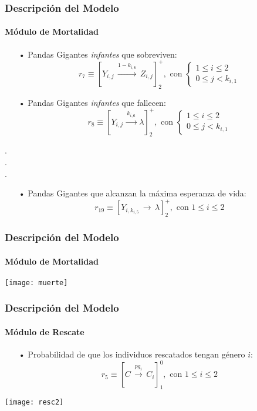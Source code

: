 \documentclass[10pt,a4paper]{beamer}
\theoremstyle{definition}
\theoremstyle{remark}
\begin{document}
\begin{frame}
\frametitle{Descripción del Modelo}
\framesubtitle{Módulo de Mortalidad}
\begin{small}
\begin{itemize}
\item[•] Pandas Gigantes \textit{infantes} que sobreviven:
$$r_7 \equiv [Y_{i,j} \,\xrightarrow{1-k_{i,6}} \, Z_{i,j} ]^+_2 , \text{ con } \left \{ \begin{matrix} 1 \leq i \leq 2
\\ 0 \leq j < k_{i,1} \end{matrix}\right. $$
\item[•] Pandas Gigantes \textit{infantes} que fallecen:
$$r_8 \equiv [Y_{i,j} \,\xrightarrow{k_{i,6}} \, \lambda ]^+_2 , \text{ con } \left \{ \begin{matrix} 1 \leq i \leq 2
\\ 0 \leq j < k_{i,1} \end{matrix}\right. $$
\end{itemize}
\begin{center}
.\\
.\\
.
\end{center}
\begin{itemize}
\item[•] Pandas Gigantes que alcanzan la máxima esperanza de vida:
$$r_{19} \equiv [Y_{i,k_{i,5}} \,\longrightarrow \, \lambda ]^+_2 , \text{ con } 1 \leq i \leq 2 $$
\end{itemize}
\end{small}
\end{frame}

\begin{frame}
\frametitle{Descripción del Modelo}
\framesubtitle{Módulo de Mortalidad}
\begin{center}
\texttt{[image: muerte]}
\end{center}
\end{frame}

\begin{frame}
\frametitle{Descripción del Modelo}
\framesubtitle{Módulo de Rescate}
\begin{small}
\begin{itemize}
\item[•] Probabilidad de que los individuos rescatados tengan género $i$:
$$r_5 \equiv [C \,\xrightarrow{pg_i} \, C_i ]^0_1 , \text{ con }  1 \leq i \leq 2 $$
\end{itemize}
\end{small}
\begin{center}
\texttt{[image: resc2]}
\end{center}
\end{frame}
\end{document}
